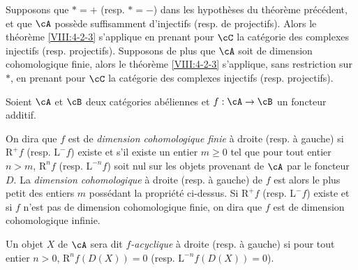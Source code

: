 \begin{corollary}\label{VIII:4-2-3-1} %
Supposons que $\ast=+$ (resp. $\ast=-$) dans les hypothèses du théorème 
précédent, et que $\cA$ possède suffisamment d'injectifs (resp. de 
projectifs). Alors le théorème \ref{VIII:4-2-3} s'applique en prenant pour 
$\cC$ la catégorie des complexes injectifs (resp. projectifs). Supposons de 
plus que $\cA$ soit de dimension cohomologique finie, alors le théorème \ref{VIII:4-2-3} 
s'applique, sans restriction sur $\ast$, en prenant pour $\cC$ la catégorie 
des complexes injectifs (resp. projectifs). 
\end{corollary}





\begin{definition}\label{VIII:4-2-5} %
Soient $\cA$ et $\cB$ deux catégories abéliennes et $f:\cA\to \cB$ un 
foncteur additif. 

On dira que $f$ est de \emph{dimension cohomologique finie} à droite (resp. 
à gauche) si $\mathrm{R}^+ f$ (resp. $\mathrm{L}^- f$) existe et s'il existe un entier 
$m\geqslant 0$ tel que pour tout entier $n>m$, $\mathrm{R}^n f$ (resp. 
$\mathrm{L}^{-n} f$) soit nul sur les objets provenant de $\cA$ par le foncteur $D$. 
La \emph{dimension cohomologique} à droite (resp. à gauche) de $f$ est 
alors le plus petit des entiers $m$ possédant la propriété ci-dessus. Si 
$\mathrm{R}^+ f$ (resp. $\mathrm{L}^- f$) existe et si $f$ n'est pas de dimension 
cohomologique finie, on dira que $f$ est de dimension cohomologique infinie. 

Un objet $X$ de $\cA$ sera dit \emph{$f$-acyclique} à droite (resp. à 
gauche) si pour tout entier $n>0$, $\mathrm{R}^n f(D(X)) = 0$ (resp. 
$\mathrm{L}^{-n} f(D(X))=0$). 
\end{definition}





